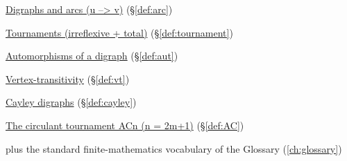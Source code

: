 \begin{closurepanel}
\item \hyperref[def:arc]{Digraphs and arcs (u --> v)} (\S\ref*{def:arc})
\item \hyperref[def:tournament]{Tournaments (irreflexive + total)} (\S\ref*{def:tournament})
\item \hyperref[def:aut]{Automorphisms of a digraph} (\S\ref*{def:aut})
\item \hyperref[def:vt]{Vertex-transitivity} (\S\ref*{def:vt})
\item \hyperref[def:cayley]{Cayley digraphs} (\S\ref*{def:cayley})
\item \hyperref[def:AC]{The circulant tournament ACn (n = 2m+1)} (\S\ref*{def:AC})
\item plus the standard finite-mathematics vocabulary of the Glossary (\cref{ch:glossary})
\end{closurepanel}
